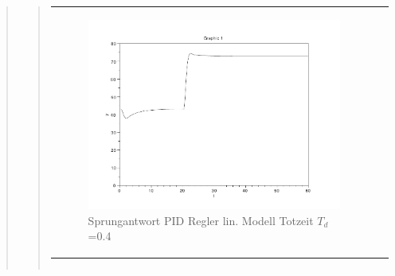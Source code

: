 \begin{quote}
\begin{quote}
\begin{center}
\begin{tabular}{ll}
                    \begin{minipage}{0.6\textwidth}
                        \begin{figure}[H]
                            \includegraphics[scale=0.4,trim = 0cm 0cm 0cm
                            0cm, clip]
                            {./Bilder/4_1_Td_04}
                              \caption{Sprungantwort PID Regler lin. Modell Totzeit $T_d$ =0.4}
                        \end{figure}
                    \end{minipage}
                
                \end{tabular}
            \end{center}

            \begin{center}
                \begin{tabular}{ll}
                

\end{tabular}
\end{center}
\end{quote}
\end{quote}
